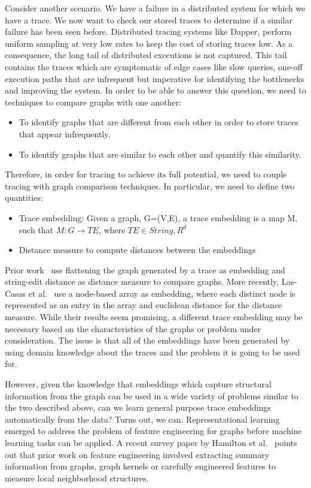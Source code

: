 Consider another scenario. We have a failure in a distributed system for which we have a trace. We now want to check our stored traces to determine if a similar failure has been seen before. Distributed tracing systems like Dapper, perform uniform sampling at very low rates to keep the cost of storing traces low. As a consequence, the long tail of distributed executions is not captured. This tail contains the traces which are symptomatic of edge cases like slow queries, one-off execution paths that are infrequent but imperative for identifying the bottlenecks and improving the system. In order to be able to answer this question, we need to techniques to compare graphs with one another:
\begin{itemize}
\item To identify graphs that are different from each other in order to store traces that appear infrequently.
\item To identify graphs that are similar to each other and quantify this similarity. 
\end{itemize}

Therefore, in order for tracing to achieve its full potential, we need to couple tracing with graph comparison techniques. In particular, we need to define two quantities:
\begin{itemize}
\item Trace embedding: \newline
Given a graph, G=(V,E), a trace embedding is a map M, such that \newline
$M\colon G \rightarrow TE$, where $TE \in String, R^{d}$
\item Distance measure to compute distances between the embeddings
\end{itemize}
Prior work~\cite{Barham:2003:MOM:1251054.1251069, Sambasivan:2011:DPC:1972457.1972463} use flattening the graph generated by a trace as embedding and string-edit distance as distance measure to compare graphs. More recently, Las-Casas et al.~\cite{Las-Casas:2018:WSE:3267809.3267841} use a node-based array as embedding, where each distinct node is represented as an entry in the array and euclidean distance for the distance measure. While their results seem promising, a different trace embedding may be necessary based on the characteristics of the graphs or problem under consideration. The issue is that all of the embeddings have been generated by using domain knowledge about the traces and the problem it is going to be used for. 

However, given the knowledge that embeddings which capture structural information from the graph can be used in a wide variety of problems similar to the two described above, can we learn general purpose trace embeddings automatically from the data? Turns out, we can. Representational learning emerged to address the problem of feature engineering for graphs before machine learning tasks can be applied. A recent survey paper by Hamilton et al.~\cite{corr_2017_abs-1709-05584} points out that prior work on feature engineering involved extracting summary information from graphs, graph kernels or carefully engineered features to measure local neighborhood structures. 

